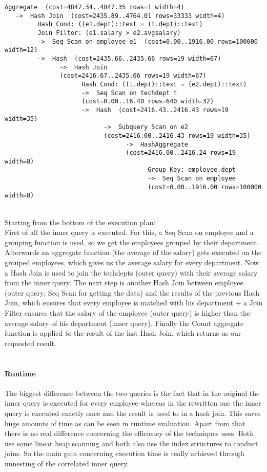 \documentclass[11pt]{scrartcl}
\begin{document}
\begin{verbatim}
Aggregate  (cost=4847.34..4847.35 rows=1 width=4)
   ->  Hash Join  (cost=2435.89..4764.01 rows=33333 width=4)
         Hash Cond: ((e1.dept)::text = (t.dept)::text)
         Join Filter: (e1.salary > e2.avgsalary)
         ->  Seq Scan on employee e1  (cost=0.00..1916.00 rows=100000 width=12)
         ->  Hash  (cost=2435.66..2435.66 rows=19 width=67)
               ->  Hash Join
               (cost=2416.67..2435.66 rows=19 width=67)
                     Hash Cond: ((t.dept)::text = (e2.dept)::text)
                     ->  Seq Scan on techdept t
                     (cost=0.00..16.40 rows=640 width=32)
                     ->  Hash  (cost=2416.43..2416.43 rows=19 width=35)
                           ->  Subquery Scan on e2
                           (cost=2416.00..2416.43 rows=19 width=35)
                                 ->  HashAggregate
                                 (cost=2416.00..2416.24 rows=19 width=8)
                                       Group Key: employee.dept
                                       ->  Seq Scan on employee
                                       (cost=0.00..1916.00 rows=100000 width=8)
\end{verbatim}
\ \\
Starting from the bottom of the execution plan:\\
First of all the inner query is executed. For this, a Seq Scan on employee and a grouping function is used, so we get the employees grouped by their department. Afterwards an aggregate function (the average of the salary) gets executed on the grouped employees, which gives us the average salary for every department. Now a Hash Join is used to join the techdepts (outer query) with their average salary from the inner query. The next step is another Hash Join between employee (outer query; Seq Scan for getting the data) and the results of the previous Hash Join, which ensures that every employee is matched with his department + a Join Filter ensures that the salary of the employee (outer query) is higher than the average salary of his department (inner query). Finally the Count aggregate function is applied to the result of the last Hash Join, which returns us our requested result.
\\ \\
\paragraph{Runtime}
The biggest difference between the two queries is the fact that in the original the inner query is executed for every employee whereas in the rewritten one the inner query is executed exactly once and the result is used to in a hash join. This saves huge amounts of time as can be seen in runtime evaluation. Apart from that there is no real difference concerning the efficiency of the techniques uses. Both use some linear heap scanning and both also use the index structures to conduct joins. So the main gain concerning execution time is really achieved through unnesting of the correlated inner query.
\end{document}

